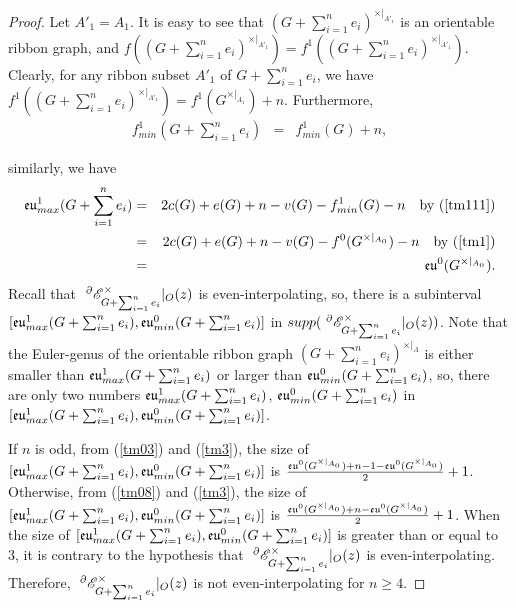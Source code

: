 \begin{proof}
Let    $A'_{1}=A_{1}$. It is easy to see that $(G +\sum ^{n}_{i=1}e_{i})^{\times|_{A'_{1}}}$ is an orientable ribbon graph,
 and  $f((G +\sum ^{n}_{i=1}e_{i})^{\times|_{A'_{1}}})=f^{1}((G +\sum ^{n}_{i=1}e_{i})^{\times|_{A'_{1}}})$.
      Clearly, for any ribbon subset $A'_{1}$ of $G +\sum ^{n}_{i=1}e_{i}$, we have
$
f^{1}((G +\sum ^{n}_{i=1}e_{i})^{\times|_{A'_{1}}})=  f^{1}(G^{\times|_{A_{1}}})+n.
$
Furthermore, \begin{eqnarray}
f^{1}_{min}(G +\sum ^{n}_{i=1}e_{i})&=&f^{1}_{min}(G)+n,\label{tm111}
\end{eqnarray}

similarly, we have
\begin{eqnarray}
{\mathfrak{eu}}^{1}_{max}(G +\sum ^{n}_{i=1}e_{i})&=& 2c(G)+e(G )+n-v(G )- f^{1}_{min}(G)-n\quad\text{by (\ref{tm111})}\notag\\
&=& 2c(G)+e(G )+n-v(G )- f^{0}(G^{\times|_{A_{0}}})-n \quad\text{by (\ref{tm1})}\notag\\
&=& {\mathfrak{eu}}^{0}(G^{\times|_{A_{0}}}).\label{tm3}
 \end{eqnarray}
 Recall
that $~^{\partial}{{\mathscr{E}}}^{\times}_{G+\sum ^{n}_{i=1}e_{i}}|_O(z)$  is even-interpolating, so,
 there is a subinterval
   $[{\mathfrak{eu}}^{1}_{max}(G +\sum ^{n}_{i=1}e_{i}),
   {\mathfrak{eu}}^{0}_{min}(G +\sum ^{n}_{i=1}e_{i})]$   in $supp(~^{\partial}{{\mathscr{E}}}^{\times}_{G+\sum ^{n}_{i=1}e_{i}}|_O(z))$. Note that the Euler-genus of the orientable ribbon graph $(G +\sum ^{n}_{i=1}e_{i})^{\times|_A}$ is either smaller than ${\mathfrak{eu}}^{1}_{max}(G +\sum ^{n}_{i=1}e_{i})$ or larger than ${\mathfrak{eu}}^{0}_{min}(G +\sum ^{n}_{i=1}e_{i})$, so, there are only two numbers ${\mathfrak{eu}}^{1}_{max}(G +\sum ^{n}_{i=1}e_{i})$,
    $ {\mathfrak{eu}}^{0}_{min}(G +\sum ^{n}_{i=1}e_{i})$ in $[{\mathfrak{eu}}^{1}_{max}(G +\sum ^{n}_{i=1}e_{i}),
    {\mathfrak{eu}}^{0}_{min}(G +\sum ^{n}_{i=1}e_{i})]$.

  { If $n$ is odd,  from (\ref{tm03}) and (\ref{tm3}), the size of  $[{\mathfrak{eu}}^{1}_{max}(G +\sum ^{n}_{i=1}e_{i}),
    {\mathfrak{eu}}^{0}_{min}(G +\sum ^{n}_{i=1}e_{i})]$ is
      $\frac{{\mathfrak{eu}}^{0}(G^{\times|_{A_{0}}})+n-1-{\mathfrak{eu}}^{0}(G^{\times|_{A_{0}}})}{2}+1$.
 Otherwise,   from (\ref{tm08}) and (\ref{tm3}), the size of  $[{\mathfrak{eu}}^{1}_{max}(G +\sum ^{n}_{i=1}e_{i}),
    {\mathfrak{eu}}^{0}_{min}(G +\sum ^{n}_{i=1}e_{i})]$ is
 $\frac{{\mathfrak{eu}}^{0}(G^{\times|_{A_{0}}})+n-{\mathfrak{eu}}^{0}(G^{\times|_{A_{0}}})}{2}+1$. When the size of $[{\mathfrak{eu}}^{1}_{max}(G +\sum ^{n}_{i=1}e_{i}),
    {\mathfrak{eu}}^{0}_{min}(G +\sum ^{n}_{i=1}e_{i})]$ is greater than or equal to 3,   it is  contrary to the hypothesis that $~^{\partial}{{\mathscr{E}}}^{\times}_{G+\sum ^{n}_{i=1}e_{i}}|_O(z)$  is even-interpolating. Therefore,
    $~^{\partial}{{\mathscr{E}}}^{\times}_{G+\sum ^{n}_{i=1}e_{i}}|_O(z)$ is not  even-interpolating for
 $n\geq4$.}


\end{proof}
